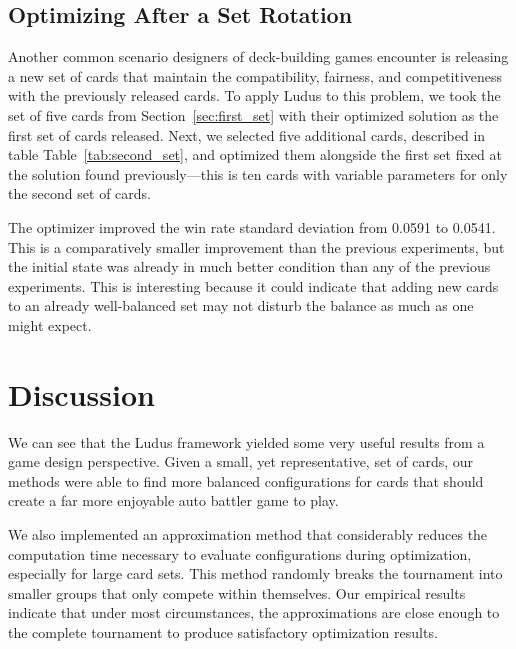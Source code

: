 \documentclass[letterpaper]{article} %
\begin{document}
\subsection{Optimizing After a Set Rotation}

Another common scenario designers of deck-building games encounter is releasing a new set %
of cards that maintain the compatibility, fairness, and competitiveness with the previously released cards. %
To apply {\sc Ludus} to this problem, we took the set of five cards from Section~\ref{sec:first_set} with their optimized solution as %
the first set of cards released. Next, we selected five additional cards, described in table Table~\ref{tab:second_set}, and optimized them alongside %
the first set fixed at the solution found previously---this is ten cards with variable parameters for only the second set of cards. 


The optimizer improved the win rate standard deviation from 0.0591 to 0.0541. This is a comparatively smaller improvement than the previous experiments, %
but the initial state was already in much better condition than any of the previous experiments. This is interesting because it could indicate that adding new cards to an already well-balanced set may not disturb the balance as much as one might expect. 

\section{Discussion} \label{sec:discussion}
We can see that the {\sc Ludus} framework yielded some very useful results from a game design perspective. Given a small, yet representative, set of cards, our methods were able to find more balanced configurations for cards that should create a far more enjoyable auto battler game to play.

We also implemented an approximation method that considerably reduces the computation time necessary to evaluate configurations during optimization, especially for large card sets. This method randomly breaks the tournament into smaller groups that only compete within themselves. Our empirical results indicate that under most circumstances, the approximations are close enough to the %
complete tournament to produce satisfactory optimization results. 
\end{document}
